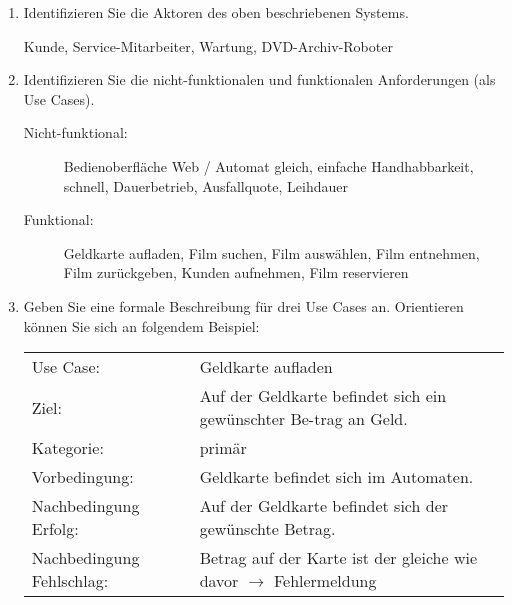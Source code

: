 \documentclass{lehramt-informatik-aufgabe}
\begin{document}
\begin{enumerate}


\item Identifizieren Sie die Aktoren des oben beschriebenen Systems.

\begin{liAntwort}
Kunde, Service-Mitarbeiter, Wartung, DVD-Archiv-Roboter
\end{liAntwort}


\item Identifizieren Sie die nicht-funktionalen und funktionalen Anforderungen (als Use Cases).

\begin{liAntwort}
\begin{description}
\item[Nicht-funktional:] Bedienoberfläche Web / Automat gleich, einfache
Handhabbarkeit, schnell, Dauerbetrieb, Ausfallquote, Leihdauer

\item[Funktional:] Geldkarte aufladen, Film suchen, Film auswählen, Film
entnehmen, Film zurückgeben, Kunden aufnehmen, Film reservieren
\end{description}
\end{liAntwort}

\item Geben Sie eine formale Beschreibung für drei Use Cases an.
Orientieren können Sie sich an folgendem Beispiel:

\begin{liAntwort}

\begin{tabularx}{\linewidth}{p{3cm}X}
Use Case: &
Geldkarte aufladen \\

Ziel: &
Auf der Geldkarte befindet sich ein gewünschter Be-trag an Geld. \\

Kategorie: & primär \\

Vorbedingung: & Geldkarte befindet sich im Automaten. \\

Nachbedingung Erfolg: &
Auf der Geldkarte befindet sich der gewünschte Betrag. \\

Nachbedingung Fehlschlag: &
Betrag auf der Karte ist der gleiche wie davor  $\rightarrow$
Fehlermeldung \\


\end{tabularx}
\end{liAntwort}
\end{enumerate}
\end{document}
